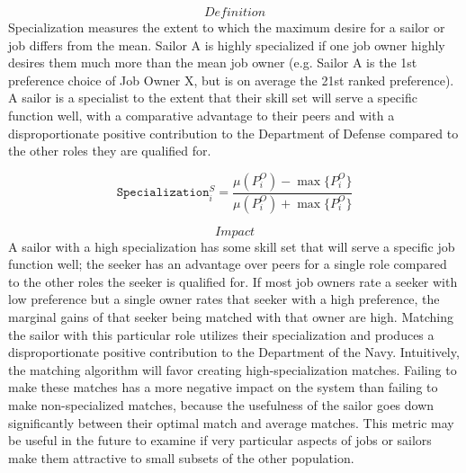 \[\textit{Definition}\] 
Specialization measures the extent to which the maximum desire for a sailor or job differs from the mean. Sailor A is highly specialized if one job owner highly desires them much more than the mean job owner (e.g. Sailor A is the 1st preference choice of Job Owner X, but is on average the 21st ranked preference). A sailor is a specialist to the extent that their skill set will serve a specific function well, with a comparative advantage to their peers and with a disproportionate positive contribution to the Department of Defense compared to the other roles they are qualified for.

\[\texttt{Specialization}^S_i = \frac{\mu(P^O_i) - \max\{P^O_i\}}{\mu(P^O_i) + \max\{P^O_i\}}\]

\[\textit{Impact}\] 
A sailor with a high specialization has some skill set that will serve a specific job function well; the seeker has an advantage over peers for a single role compared to the other roles the seeker is qualified for. If most job owners rate a seeker with low preference but a single owner rates that seeker with a high preference, the marginal gains of that seeker being matched with that owner are high. Matching the sailor with this particular role utilizes their specialization and produces a disproportionate positive contribution to the Department of the Navy. Intuitively, the matching algorithm will favor creating high-specialization matches. Failing to make these matches has a more negative impact on the system than failing to make non-specialized matches, because the usefulness of the sailor goes down significantly between their optimal match and average matches. This metric may be useful in the future to examine if very particular aspects of jobs or sailors make them attractive to small subsets of the other population.